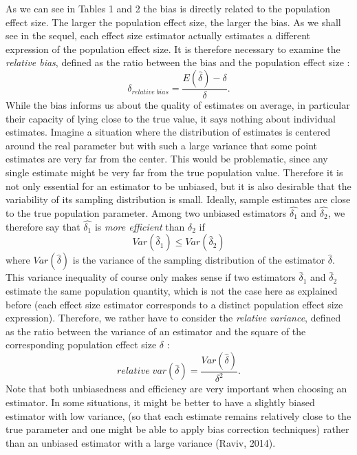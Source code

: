 \documentclass[
  english,
  man,floatsintext]{apa6}
\begin{document}
As we can see in Tables 1 and 2 the bias is directly related to the population effect size. The larger the population effect size, the larger the bias. As we shall see in the sequel, each effect size estimator actually estimates a different expression of the population effect size. It is therefore necessary to examine the \emph{relative bias}, defined as the ratio between the bias and the population effect size :
\begin{equation} 
\delta_{relative \; bias}=\frac{E(\hat{\delta})-\delta}{\delta}.
\label{eqn:RELBIAS}
\end{equation}
While the bias informs us about the quality of estimates on average, in particular their capacity of lying close to the true value, it says nothing about individual estimates. Imagine a situation where the distribution of estimates is centered around the real parameter but with such a large variance that some point estimates are very far from the center. This would be problematic, since any single estimate might be very far from the true population value. Therefore it is not only essential for an estimator to be unbiased, but it is also desirable that the variability of its sampling distribution is small. Ideally, sample estimates are close to the true population parameter. Among two unbiased estimators \(\hat{\delta_1}\) and \(\hat{\delta_2}\), we therefore say that \(\hat{\delta_1}\) is \emph{more efficient} than \(\hat{\delta_2}\) if
\begin{equation} 
Var(\hat{\delta}_1) \leq Var(\hat{\delta}_2)
\label{eqn:EFFICIENCY}
\end{equation}
where \(Var(\hat{\delta})\) is the variance of the sampling distribution of the estimator \(\hat{\delta}\). This variance inequality of course only makes sense if two estimators \(\hat{\delta}_1\) and \(\hat{\delta}_2\) estimate the same population quantity, which is not the case here as explained before (each effect size estimator corresponds to a distinct population effect size expression). Therefore, we rather have to consider the \emph{relative variance}, defined as the ratio between the variance of an estimator and the square of the corresponding population effect size \(\delta\) :
\begin{equation} 
relative \; var(\hat{\delta})=\frac{Var(\hat{\delta})}{\delta^2}.
\label{eqn:RELVAR}
\end{equation}
Note that both unbiasedness and efficiency are very important when choosing an estimator. In some situations, it might be better to have a slightly biased estimator with low variance, (so that each estimate remains relatively close to the true parameter and one might be able to apply bias correction techniques) rather than an unbiased estimator with a large variance (Raviv, 2014).
\end{document}
